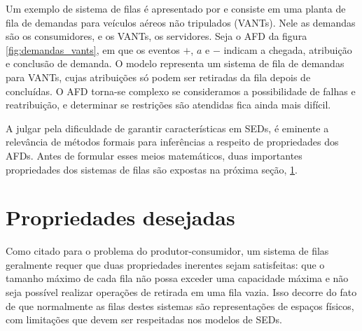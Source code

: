 Um exemplo de sistema de filas é apresentado por  e consiste em uma planta de fila de demandas para veículos aéreos não tripulados (\acs{VANT}s). Nele as demandas são os consumidores, e os VANTs, os servidores. Seja o AFD da figura \ref{fig:demandas_vants}, em que os eventos $+$, $a$ e $-$ indicam a chegada, atribuição e conclusão de demanda. O modelo representa um sistema de fila de demandas para VANTs, cujas atribuições só podem ser retiradas da fila depois de concluídas. O AFD torna-se complexo se consideramos a possibilidade de falhas e reatribuição, e determinar se restrições são atendidas fica ainda mais difícil.


A julgar pela dificuldade de garantir características em SEDs, é eminente a relevância de métodos formais para inferências a respeito de propriedades dos AFDs. Antes de formular esses meios matemáticos, duas importantes propriedades dos sistemas de filas são expostas na próxima seção, \ref{sec:props}.

\section{Propriedades desejadas}
\label{sec:props}

Como citado para o problema do produtor-consumidor, um sistema de filas geralmente requer que duas propriedades inerentes sejam satisfeitas: que o tamanho máximo de cada fila não possa exceder uma capacidade máxima e não seja possível realizar operações de retirada em uma fila vazia. Isso decorre do fato de que normalmente as filas destes sistemas são representações de espaços físicos, com limitações que devem ser respeitadas nos modelos de SEDs.

